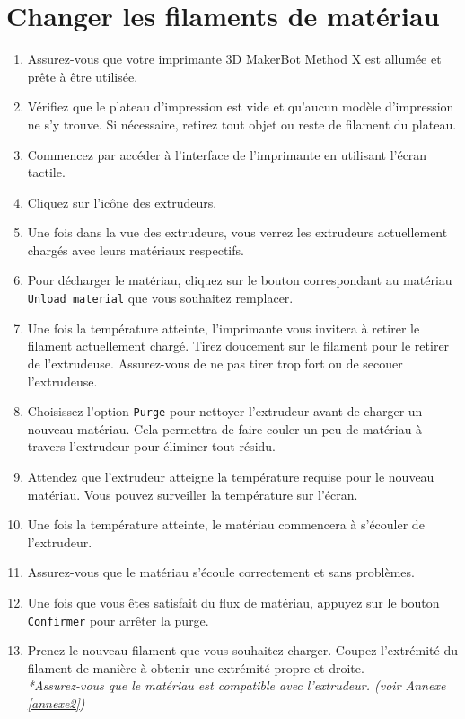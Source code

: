 \documentclass{Thesis}
\begin{document}
\section{Changer les filaments de matériau}
\begin{enumerate}
    \item Assurez-vous que votre imprimante 3D MakerBot Method X est allumée et prête à être utilisée.
    \item Vérifiez que le plateau d'impression est vide et qu'aucun modèle d'impression ne s'y trouve. Si nécessaire, retirez tout objet ou reste de filament du plateau.
    \item Commencez par accéder à l'interface de l'imprimante en utilisant l'écran tactile.
    \item Cliquez sur l'icône des extrudeurs.
    \item Une fois dans la vue des extrudeurs, vous verrez les extrudeurs actuellement chargés avec leurs matériaux respectifs.
    \item Pour décharger le matériau, cliquez sur le bouton correspondant au matériau \texttt{Unload material} que vous souhaitez remplacer.
    \item Une fois la température atteinte, l'imprimante vous invitera à retirer le filament actuellement chargé. Tirez doucement sur le filament pour le retirer de l'extrudeuse. Assurez-vous de ne pas tirer trop fort ou de secouer l'extrudeuse.
    \item Choisissez l'option \texttt{Purge} pour nettoyer l'extrudeur avant de charger un nouveau matériau. Cela permettra de faire couler un peu de matériau à travers l'extrudeur pour éliminer tout résidu.
    \item Attendez que l'extrudeur atteigne la température requise pour le nouveau matériau. Vous pouvez surveiller la température sur l'écran.
    \item Une fois la température atteinte, le matériau commencera à s'écouler de l'extrudeur.
    \item Assurez-vous que le matériau s'écoule correctement et sans problèmes.
    \item Une fois que vous êtes satisfait du flux de matériau, appuyez sur le bouton \texttt{Confirmer} pour arrêter la purge.
    \item Prenez le nouveau filament que vous souhaitez charger. Coupez l'extrémité du filament de manière à obtenir une extrémité propre et droite.\\
    \textit{*Assurez-vous que le matériau est compatible avec l'extrudeur. (voir Annexe \ref{annexe2})}

\end{enumerate}
\end{document}

